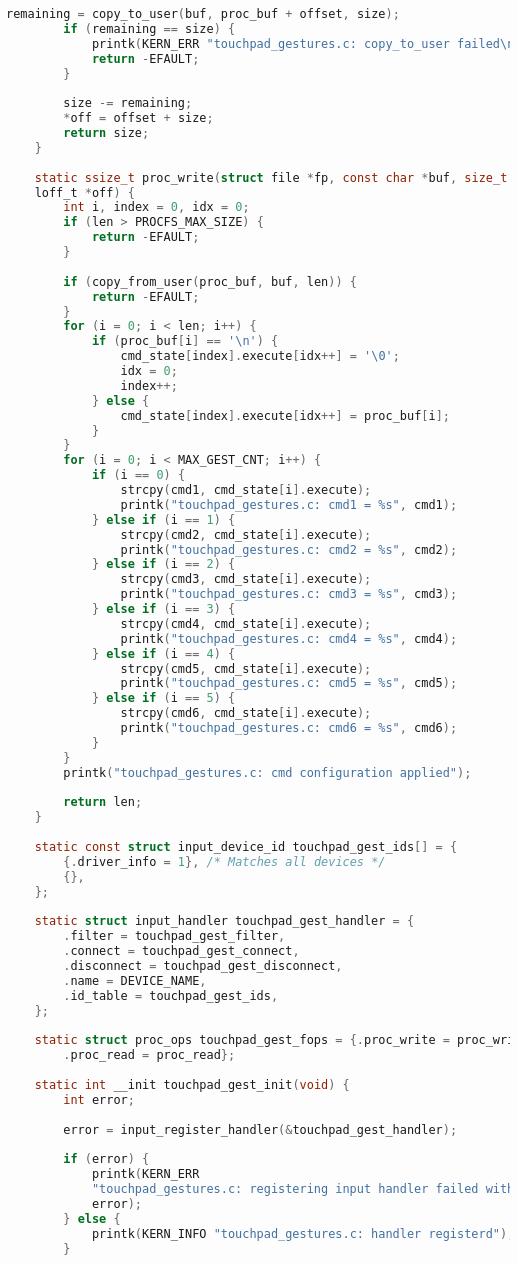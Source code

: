 \begin{lstlisting}[label=lst:module,caption=Реализация загружаемого модуля ядра, language=c]
		remaining = copy_to_user(buf, proc_buf + offset, size);
		if (remaining == size) {
			printk(KERN_ERR "touchpad_gestures.c: copy_to_user failed\n");
			return -EFAULT;
		}
		
		size -= remaining;
		*off = offset + size;
		return size;
	}
	
	static ssize_t proc_write(struct file *fp, const char *buf, size_t len,
	loff_t *off) {
		int i, index = 0, idx = 0;
		if (len > PROCFS_MAX_SIZE) {
			return -EFAULT;
		}
		
		if (copy_from_user(proc_buf, buf, len)) {
			return -EFAULT;
		}
		for (i = 0; i < len; i++) {
			if (proc_buf[i] == '\n') {
				cmd_state[index].execute[idx++] = '\0';
				idx = 0;
				index++;
			} else {
				cmd_state[index].execute[idx++] = proc_buf[i];
			}
		}
		for (i = 0; i < MAX_GEST_CNT; i++) {
			if (i == 0) {
				strcpy(cmd1, cmd_state[i].execute);
				printk("touchpad_gestures.c: cmd1 = %s", cmd1);
			} else if (i == 1) {
				strcpy(cmd2, cmd_state[i].execute);
				printk("touchpad_gestures.c: cmd2 = %s", cmd2);
			} else if (i == 2) {
				strcpy(cmd3, cmd_state[i].execute);
				printk("touchpad_gestures.c: cmd3 = %s", cmd3);
			} else if (i == 3) {
				strcpy(cmd4, cmd_state[i].execute);
				printk("touchpad_gestures.c: cmd4 = %s", cmd4);
			} else if (i == 4) {
				strcpy(cmd5, cmd_state[i].execute);
				printk("touchpad_gestures.c: cmd5 = %s", cmd5);
			} else if (i == 5) {
				strcpy(cmd6, cmd_state[i].execute);
				printk("touchpad_gestures.c: cmd6 = %s", cmd6);
			}
		}
		printk("touchpad_gestures.c: cmd configuration applied");
		
		return len;
	}
	
	static const struct input_device_id touchpad_gest_ids[] = {
		{.driver_info = 1}, /* Matches all devices */
		{},
	};
	
	static struct input_handler touchpad_gest_handler = {
		.filter = touchpad_gest_filter,
		.connect = touchpad_gest_connect,
		.disconnect = touchpad_gest_disconnect,
		.name = DEVICE_NAME,
		.id_table = touchpad_gest_ids,
	};
	
	static struct proc_ops touchpad_gest_fops = {.proc_write = proc_write,
		.proc_read = proc_read};
	
	static int __init touchpad_gest_init(void) {
		int error;
		
		error = input_register_handler(&touchpad_gest_handler);
		
		if (error) {
			printk(KERN_ERR
			"touchpad_gestures.c: registering input handler failed with (%d)\n",
			error);
		} else {
			printk(KERN_INFO "touchpad_gestures.c: handler registerd");
		}
		

\end{lstlisting}
